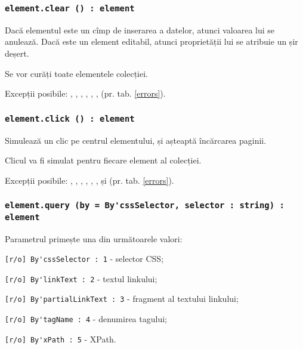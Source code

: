 \subsubsection{\lstinline|element.clear () : element|}

Dacă elementul este un cîmp de inserarea a datelor, atunci valoarea lui se anulează. Dacă este un element editabil, atunci proprietății lui  se atribuie un șir deșert.

\code{[icL]} Se vor curăți toate elementele colecției.

Excepții posibile: , , , , , ,  (pr. tab. \ref{errors}).

\subsubsection{\lstinline|element.click () : element|}

Simulează un clic pe centrul elementului, și așteaptă încărcarea paginii.

\code{[icL]} Clicul va fi simulat pentru fiecare element al colecției.

Excepții posibile: , , , , , ,  și  (pr. tab. \ref{errors}).

\subsubsection{\lstinline|element.query (by = By'cssSelector, selector : string) : element|}

Parametrul  primește una din următoarele valori:
\begin{icItems}
    \item \lstinline|[r/o] By'cssSelector : 1| - selector CSS;
	\item \lstinline|[r/o] By'linkText : 2| - textul linkului;
	\item \lstinline|[r/o] By'partialLinkText : 3| - fragment al textului linkului;
	\item \lstinline|[r/o] By'tagName : 4| - denumirea tagului;
	\item \lstinline|[r/o] By'xPath : 5| - XPath.
\end{icItems}

